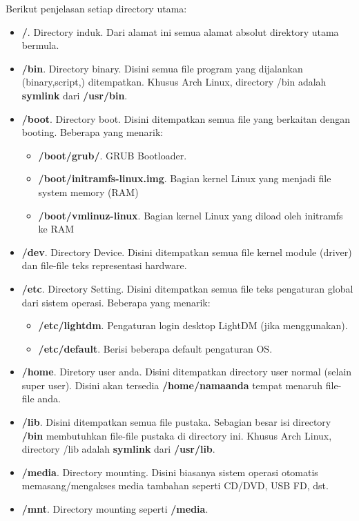 \documentclass[12pt,]{article}
\begin{document}
	Berikut penjelasan setiap directory utama:
	\begin{itemize}
		\item \textbf{/}. Directory induk. Dari alamat ini semua alamat absolut direktory utama bermula.
		\item \textbf{/bin}. Directory binary. Disini semua file program yang dijalankan (binary,script,) ditempatkan.
		Khusus Arch Linux, directory /bin adalah \textbf{symlink} dari \textbf{/usr/bin}.
		\item \textbf{/boot}. Directory boot. Disini ditempatkan semua file yang berkaitan dengan booting. Beberapa yang menarik:
		\begin{itemize}
			\item \textbf{/boot/grub/}. GRUB Bootloader.
			\item \textbf{/boot/initramfs-linux.img}. Bagian kernel Linux yang menjadi file system memory (RAM) 
			\item \textbf{/boot/vmlinuz-linux}. Bagian kernel Linux yang diload oleh initramfs ke RAM
		\end{itemize}
		\item \textbf{/dev}. Directory Device. Disini ditempatkan semua file kernel module (driver) dan file-file teks representasi hardware.
		\item \textbf{/etc}. Directory Setting. Disini ditempatkan semua file teks pengaturan global dari sistem operasi. Beberapa yang menarik:
		\begin{itemize}
			\item \textbf{/etc/lightdm}. Pengaturan login desktop LightDM (jika menggunakan).
			\item \textbf{/etc/default}. Berisi beberapa default pengaturan OS.
		\end{itemize}
		\item \textbf{/home}. Diretory user anda. Disini ditempatkan directory user normal (selain super user).
		Disini akan tersedia \textbf{/home/namaanda} tempat menaruh file-file anda.
		\item \textbf{/lib}. Disini ditempatkan semua file pustaka.
		Sebagian besar isi directory \textbf{/bin} membutuhkan file-file pustaka di directory ini.
		Khusus Arch Linux, directory /lib adalah \textbf{symlink} dari \textbf{/usr/lib}.
		\item \textbf{/media}. Directory mounting.
		Disini biasanya sistem operasi otomatis memasang/mengakses media tambahan seperti CD/DVD, USB FD, dst.
		\item \textbf{/mnt}. Directory mounting seperti \textbf{/media}.

\end{itemize}
\end{document}
